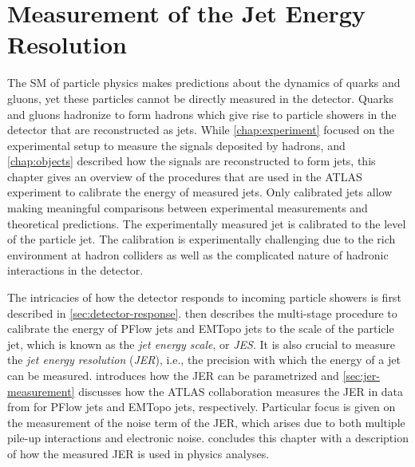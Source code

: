 \chapter{Measurement of the Jet Energy Resolution}
\label{chap:calibration}
The SM of particle physics makes predictions about the dynamics of quarks and gluons, yet these particles cannot be directly measured in the detector. Quarks and gluons hadronize to form hadrons which give rise to particle showers in the detector that are reconstructed as jets.
While \cref{chap:experiment} focused on the experimental setup to measure the signals deposited by hadrons, and \cref{chap:objects} described how the signals are reconstructed to form jets, this chapter gives an overview of the procedures that are used in the ATLAS experiment to calibrate the energy of measured jets. Only calibrated jets allow making meaningful comparisons between experimental measurements and theoretical predictions.
The experimentally measured jet is calibrated to the level of the particle jet. The calibration is experimentally challenging due to the rich environment at hadron colliders as well as the complicated nature of hadronic interactions in the detector. 

The intricacies of how the detector responds to incoming particle showers is first described in \cref{sec:detector-response}.  then describes the multi-stage procedure to calibrate the energy of PFlow jets and EMTopo jets to the scale of the particle jet, which is known as the \emph{jet energy scale}, or \emph{JES}.
It is also crucial to measure the \emph{jet energy resolution} (\emph{JER}), i.e., the precision with which the energy of a jet can be measured.  introduces how the JER can be parametrized and \cref{sec:jer-measurement} discusses how the ATLAS collaboration measures the JER in data from \RunTwo for PFlow jets and EMTopo jets, respectively. Particular focus is given on the measurement of the noise term of the JER, which arises due to both multiple pile-up interactions and electronic noise.  concludes this chapter with a description of how the measured JER is used in physics analyses.

